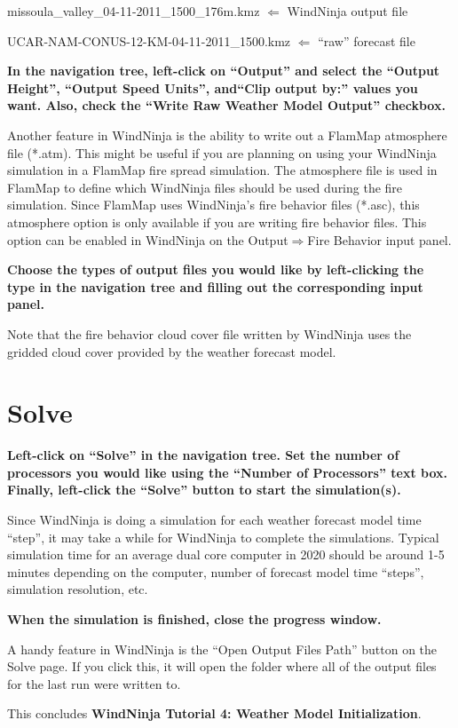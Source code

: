 \documentclass[12pt]{article}
\begin{document}
missoula\_valley\_04-11-2011\_1500\_176m.kmz $\Leftarrow$ WindNinja output file

UCAR-NAM-CONUS-12-KM-04-11-2011\_1500.kmz  $\Leftarrow$  “raw” forecast file

\textbf{\color{red} In the navigation tree, left-click on “Output” and select the “Output Height”, “Output Speed Units”, and“Clip output by:” values you want.  
Also, check the “Write Raw Weather Model Output” checkbox.}

Another feature in WindNinja is the ability to write out a FlamMap atmosphere file (*.atm).  
This might be useful if you are planning on using your WindNinja simulation in a FlamMap fire spread simulation.  
The atmosphere file is used in FlamMap to define which WindNinja files should be used during the fire simulation.  
Since FlamMap uses WindNinja's fire behavior files (*.asc), this atmosphere option is only available if you are writing fire behavior files.  
This option can be enabled in WindNinja on the Output$\Rightarrow$Fire Behavior input panel.

\textbf{\color{red}Choose the types of output files you would like by left-clicking the type in the navigation tree and filling out the corresponding input panel.}

Note that the fire behavior cloud cover file written by WindNinja uses the gridded cloud cover provided by the weather forecast model.

\section{Solve}

\textbf{\color{red} Left-click on “Solve” in the navigation tree.  
Set the number of processors you would like using the “Number of Processors” text box.  
Finally, left-click the “Solve” button to start the simulation(s).}

Since WindNinja is doing a simulation for each weather forecast model time “step”, it may take a while for WindNinja to complete the simulations.  
Typical simulation time for an average dual core computer in 2020 should be around 1-5 minutes depending on the computer, number of forecast model time “steps”, simulation resolution, etc.

\textbf{\color{red} When the simulation is finished, close the progress window.}

A handy feature in WindNinja is the “Open Output Files Path” button on the Solve page.  
If you click this, it will open the folder where all of the output files for the last run were written to.

This concludes \textbf{WindNinja Tutorial 4: Weather Model Initialization}.
\end{document}
